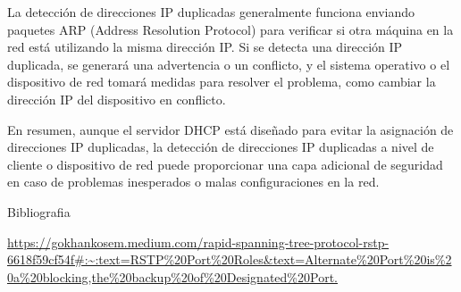 \documentclass[a4paper]{article}
\begin{document}
\begin{enumerate}
La detección de direcciones IP duplicadas generalmente funciona enviando paquetes ARP (Address Resolution Protocol) para verificar si otra máquina en la red está utilizando la misma dirección IP. Si se detecta una dirección IP duplicada, se generará una advertencia o un conflicto, y el sistema operativo o el dispositivo de red tomará medidas para resolver el problema, como cambiar la dirección IP del dispositivo en conflicto.

En resumen, aunque el servidor DHCP está diseñado para evitar la asignación de direcciones IP duplicadas, la detección de direcciones IP duplicadas a nivel de cliente o dispositivo de red puede proporcionar una capa adicional de seguridad en caso de problemas inesperados o malas configuraciones en la red.
\end{enumerate}
Bibliografia

\url{https://gokhankosem.medium.com/rapid-spanning-tree-protocol-rstp-6618f59cf54f#:~:text=RSTP%20Port%20Roles&text=Alternate%20Port%20is%20a%20blocking,the%20backup%20of%20Designated%20Port.}
	
		
\end{document}
